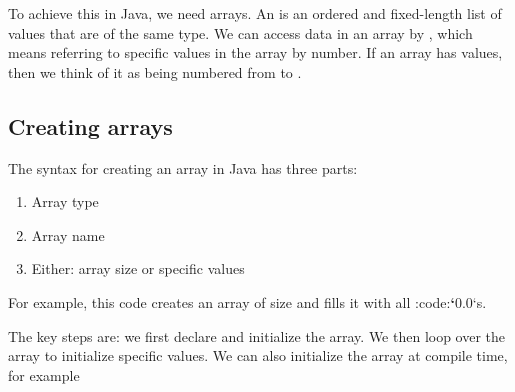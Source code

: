 \documentclass[letterpaper,10pt,english,openany,oneside]{sphinxmanual}
\begin{document}
To achieve this in Java, we need arrays. An  is an ordered and fixed-length list of values that are of the same type. We can access data in an array by , which means referring to specific values in the array by number. If an array has  values, then we think of it as being numbered from  to .


\subsection{Creating arrays}
\label{\detokenize{arrays-arraylists:creating-arrays}}
The syntax for creating an array in Java has three parts:
\begin{enumerate}
\def\theenumi{\arabic{enumi}}
\def\labelenumi{\theenumi .}
\makeatletter\def\p@enumii{\p@enumi \theenumi .}\makeatother
\item {} 
Array type

\item {} 
Array name

\item {} 
Either: array size or specific values

\end{enumerate}

For example, this code creates an array of size  and fills it with all :code:{\color{red}\bfseries{}{}`}0.0{}`s.

\begin{sphinxVerbatim}[commandchars=\\\{\}]
\PYG{p}{[}\PYG{p}{]}                       
   \PYG{p}{[}\PYG{p}{]}                
                
    \PYG{p}{[}\PYG{p}{]}                       
\end{sphinxVerbatim}

The key steps are: we first declare and initialize the array. We then loop over the array to initialize specific values. We can also initialize the array at compile time, for example
\end{document}

